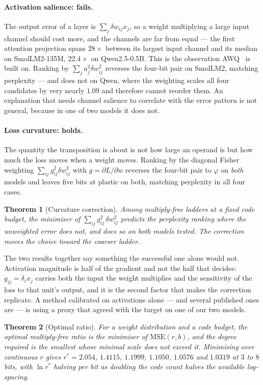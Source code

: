 \documentclass[11pt]{article}
\newtheorem{theorem}{Theorem}
\theoremstyle{definition}
\begin{document}
\paragraph{Activation salience: fails.} The output error of a layer is
$\sum_j \delta w_{ij}x_j$, so a weight multiplying a large input channel should
cost more, and the channels are far from equal --- the first attention
projection spans $28\times$ between its largest input channel and its median on
SmolLM2-135M, $22.4\times$ on Qwen2.5-0.5B. This is the observation
AWQ~\cite{awq} is built on. Ranking by $\sum_j a_j^{2}\delta w_{ij}^{2}$
reverses the four-bit pair on SmolLM2, matching perplexity --- and does not on
Qwen, where the weighting scales all four candidates by very nearly $1.09$ and
therefore cannot reorder them. An explanation that needs channel salience to
correlate with the error pattern is not general, because in one of two models it
does not.

\paragraph{Loss curvature: holds.} The quantity the transposition is about is
not how large an operand is but how much the loss moves when a weight moves.
Ranking by the diagonal Fisher weighting $\sum_{ij} g_{ij}^{2}\delta w_{ij}^{2}$
with $g=\partial L/\partial w$ reverses the four-bit pair to $\varphi$ on
\emph{both} models and leaves five bits at plastic on both, matching perplexity
in all four cases.

\begin{theorem}[Curvature correction]\label{thm:curvature}
Among multiply-free ladders at a fixed code budget, the minimiser of
$\sum_{ij} g_{ij}^{2}\,\delta w_{ij}^{2}$ predicts the perplexity ranking where
the unweighted error does not, and does so on both models tested. The correction
moves the choice toward the coarser ladder.
\end{theorem}

The two results together say something the successful one alone would not.
Activation magnitude is half of the gradient and not the half that decides:
$g_{ij} = \delta_i x_j$ carries both the input the weight multiplies and the
sensitivity of the loss to that unit's output, and it is the second factor that
makes the correction replicate. A method calibrated on activations alone --- and
several published ones are --- is using a proxy that agreed with the target on
one of our two models.

\begin{theorem}[Optimal ratio]\label{thm:optratio}
For a weight distribution and a code budget, the optimal multiply-free ratio is
the minimiser of $\mathrm{MSE}(r,b)$, and the degree required is the smallest
whose minimal scale does not exceed it. Minimising over continuous $r$ gives
$r^{*}=2.054$, $1.4115$, $1.1999$, $1.1050$, $1.0576$ and $1.0319$ at $3$ to
$8$ bits,
with $\ln r^{*}$ halving per bit as doubling the code count halves the available
log-spacing.
\end{theorem}
\end{document}
